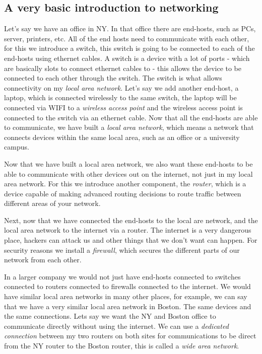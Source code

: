 \subsection{A very basic introduction to networking}
Let's say we have an office in NY. In that office there are end-hosts, such as PCs, server, printers, etc. All of the end hosts need to communicate with each other, for this we introduce a switch, this switch is going to be connected to each of the end-hosts using ethernet cables. A switch is a device with a lot of ports - which are basically slots to connect ethernet cables to - this allows the device to be connected to each other through the switch. The switch is what allows connectivity on my \emph{local area network}. Let's say we add another end-host, a laptop, which is connected wirelessly to the same switch, the laptop will be connected via WIFI to a \emph{wireless access point} and the wireless access point is connected to the switch via an ethernet cable. Now that all the end-hosts are able to communicate, we have built a \emph{local area network}, which means a network that connects devices within the same local area, such as an office or a university campus.


Now that we have built a local area network, we also want these end-hosts to be able to communicate with other devices out on the internet, not just in my local area network. For this we introduce another component, the \emph{router}, which is a device capable of making advanced routing decisions to route traffic between different areas of your network.


Next, now that we have connected the end-hosts to the local are network, and the local area network to the internet via a router. The internet is a very dangerous place, hackers can attack us and other things that we don't want can happen. For security reasons we install a \emph{firewall}, which secures the different parts of our network from each other.


In a larger company we would not just have end-hosts connected to switches connected to routers connected to firewalls connected to the internet. We would have similar local area networks in many other places, for example, we can say that we have a very similar local area network in Boston. The same devices and the same connections. Lets say we want the NY and Boston office to communicate directly without using the internet. We can use a \emph{dedicated connection} between my two routers on both sites for communications to be direct from the NY router to the Boston router, this is called a \emph{wide area network}.


